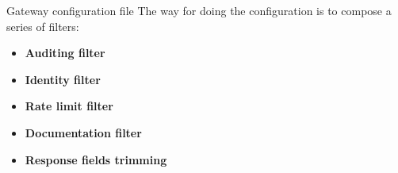 \documentclass[10pt]{beamer}
\begin{document}

\begin{frame}{Gateway configuration file}
    The way for doing the configuration is to compose a series of filters:
    
    \begin{itemize}
        \item \textbf{Auditing filter}
        \item \textbf{Identity filter}
        \item \textbf{Rate limit filter}
        \item \textbf{Documentation filter}
        \item \textbf{Response fields trimming}
    \end{itemize}
\end{frame}
\end{document}
